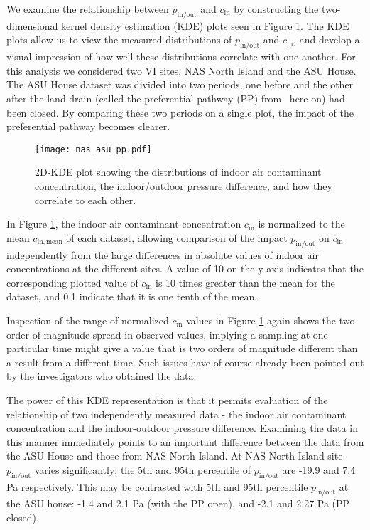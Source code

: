 \documentclass[preprint,12pt]{elsarticle}
\begin{document}
We examine the relationship between $p_\mathrm{in/out}$ and $c_\mathrm{in}$ by constructing the two-dimensional kernel density estimation (KDE) plots seen in Figure \ref{fig:kde}.
The KDE plots allow us to view the measured distributions of $p_\mathrm{in/out}$ and $c_\mathrm{in}$, and develop a visual impression of how well these distributions correlate with one another.
For this analysis we considered two VI sites, NAS North Island and the ASU House.
The ASU House dataset was divided into two periods, one before and the other after the land drain (called the preferential pathway (PP) from  here on) had been closed.
By comparing these two periods on a single plot, the impact of the preferential pathway becomes clearer.\par

\begin{figure}[htb!]
 \centering
 \texttt{[image: nas\_asu\_pp.pdf]}
 \caption{2D-KDE plot showing the distributions of indoor air contaminant concentration, the indoor/outdoor pressure difference, and how they correlate to each other.}\label{fig:kde}
\end{figure}

In Figure \ref{fig:kde}, the indoor air contaminant concentration $c_\mathrm{in}$ is normalized to the mean $c_\mathrm{in,mean}$ of each dataset, allowing comparison of the impact $p_\mathrm{in/out}$ on $c_\mathrm{in}$ independently from the large differences in absolute values of indoor air concentrations at the different sites.
A value of 10 on the y-axis indicates that the corresponding plotted value of $c_\mathrm{in}$ is 10 times greater than the mean for the dataset, and 0.1 indicate that it is one tenth of the mean.\par

Inspection of the range of normalized $c_\mathrm{in}$ values in Figure \ref{fig:kde} again shows the two order of magnitude spread in observed values, implying a sampling at one particular time might give a value that is two orders of magnitude different than a result from a different time.
Such issues have of course already been pointed out by the investigators who obtained the data.\par

The power of this KDE representation is that it permits evaluation of the relationship of two independently measured data - the indoor air contaminant concentration and the indoor-outdoor pressure difference.
Examining the data in this manner immediately points to an important difference between the data from the ASU House and those from NAS North Island.
At NAS North Island site $p_\mathrm{in/out}$ varies significantly; the 5th and 95th percentile of $p_\mathrm{in/out}$ are -19.9 and 7.4 Pa respectively.
This may be contrasted with 5th and 95th percentile $p_\mathrm{in/out}$ at the ASU house: -1.4 and 2.1 Pa (with the PP open), and -2.1 and 2.27 Pa (PP closed).\par
\end{document}
